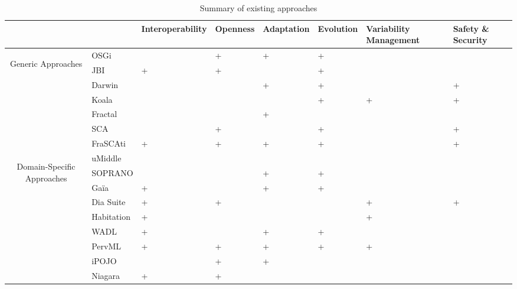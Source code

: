 \begin{table}[h!]
\begin{tabular}{cm{}|| >{\centering\arraybackslash}m{}| >{\centering\arraybackslash}m{}| >{\centering\arraybackslash}m{}| >{\centering\arraybackslash}m{}| >{\centering}m{}| >{\centering\arraybackslash}m{}|}
 & & {\tiny Interoperability} & {\tiny Openness} & {\tiny Adaptation} & {\tiny Evolution} & {\tiny Variability Management} & {\tiny Safety \& Security}\\
 \hline\hline
 \multirow{7}{8mm}{\begin{sideways}\parbox{25mm}{\centering Generic Approaches}\end{sideways}}
 &{\small OSGi} 		&  & + & + & + &  &  \\ 
 &{\small JBI} 			& + & + &  & + &  &  \\
 \cline{2-8}%
 &{\small Darwin} 		&  &  & + & + &   & + \\ 
 &{\small Koala} 		&  &  &   & + & + & + \\
 &{\small Fractal} 		&  &  & + &   &   &  \\
 \cline{2-8}%
 &{\small SCA} 			&   & + &  & + &  & +\\
 &{\small FraSCAti}     & + & + & + & + &  & + \\
 \hline\hline
 \multirow{9}{8mm}{\begin{sideways}\parbox{30mm}{\centering  Domain-Specific Approaches}\end{sideways}} 
 &{\small uMiddle} 		&  &  &  &  &  &  \\
 &{\small SOPRANO} 		&  &  & + & + &  &  \\
 &{\small Ga\"ia} 		& + &  & + & + &  &  \\
 &{\small Dia Suite} 	& + & + &  &  & + & + \\
 &{\small Habitation} 	& + &  &  &  & + &  \\
 &{\small WADL} 		& + &  & + & + &  &  \\
 &{\small PervML} 		& + & + & + & + & + &  \\
 &{\small iPOJO} 		&  & + & + &  &  &  \\
 &{\small Niagara} 		& + & + &  &  &  &  \\
 \hline
\end{tabular}

\caption{Summary of existing approaches}
\label{tab:summaryOfApproaches}
\end{table}




